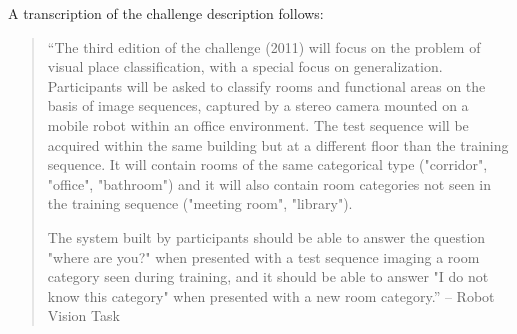 A transcription of the challenge description follows:

\begin{quotation}``The third edition of the challenge (2011) will focus on the problem of visual place classification, with a special focus on generalization.
Participants will be asked to classify rooms and functional areas on the basis of image sequences, captured by a stereo camera mounted on a mobile robot within an office environment.
The test sequence will be acquired within the same building but at a different floor than the training sequence.
It will contain rooms of the same categorical type ("corridor", "office", "bathroom") and it will also contain room categories not seen in the training sequence ("meeting room", "library").

The system built by participants should be able to answer the question "where are you?" when presented with a test sequence imaging a room category seen during training, and it should be able to answer "I do not know this category" when presented with a new room category.'' -- Robot Vision Task
\end{quotation}

